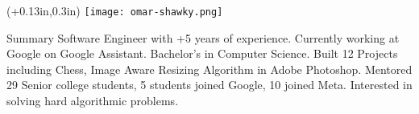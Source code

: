 \documentclass{resume} %
\begin{document}

\begin{textblock*}{\paperwidth}(+0.13in,0.3in) %
    \noindent\texttt{[image: omar-shawky.png]}
\end{textblock*}


\begin{rSection}{Summary}
    Software Engineer with +5 years of experience.
    Currently working at Google on Google Assistant.
    Bachelor's in Computer Science.
    Built 12 Projects including Chess, Image Aware Resizing Algorithm in Adobe Photoshop.
    Mentored 29 Senior college students, 5 students joined Google, 10 joined Meta.
    Interested in solving hard algorithmic problems.
\end{rSection}

\end{document}
